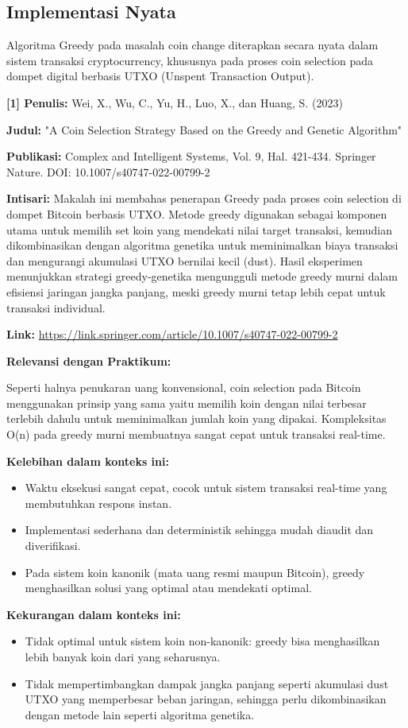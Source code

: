 \subsection{Implementasi Nyata}
Algoritma Greedy pada masalah coin change diterapkan secara nyata dalam sistem transaksi cryptocurrency, khususnya pada proses coin selection pada dompet digital berbasis UTXO (Unspent Transaction Output).

\vspace{1em}
\textbf{[1] Penulis:} Wei, X., Wu, C., Yu, H., Luo, X., dan Huang, S. (2023)

\textbf{Judul:} "A Coin Selection Strategy Based on the Greedy and Genetic Algorithm"

\textbf{Publikasi:} Complex and Intelligent Systems, Vol. 9, Hal. 421-434. Springer Nature. DOI: 10.1007/s40747-022-00799-2

\textbf{Intisari:} Makalah ini membahas penerapan Greedy pada proses coin selection di dompet Bitcoin berbasis UTXO. Metode greedy digunakan sebagai komponen utama untuk memilih set koin yang mendekati nilai target transaksi, kemudian dikombinasikan dengan algoritma genetika untuk meminimalkan biaya transaksi dan mengurangi akumulasi UTXO bernilai kecil (dust). Hasil eksperimen menunjukkan strategi greedy-genetika mengungguli metode greedy murni dalam efisiensi jaringan jangka panjang, meski greedy murni tetap lebih cepat untuk transaksi individual.

\textbf{Link:} \url{https://link.springer.com/article/10.1007/s40747-022-00799-2}

\vspace{1em}
\textbf{Relevansi dengan Praktikum:} 

Seperti halnya penukaran uang konvensional, coin selection pada Bitcoin menggunakan prinsip yang sama yaitu memilih koin dengan nilai terbesar terlebih dahulu untuk meminimalkan jumlah koin yang dipakai. Kompleksitas O(n) pada greedy murni membuatnya sangat cepat untuk transaksi real-time.

\vspace{1em}
\textbf{Kelebihan dalam konteks ini:}
\begin{itemize}
    \item Waktu eksekusi sangat cepat, cocok untuk sistem transaksi real-time yang membutuhkan respons instan.
    \item Implementasi sederhana dan deterministik sehingga mudah diaudit dan diverifikasi.
    \item Pada sistem koin kanonik (mata uang resmi maupun Bitcoin), greedy menghasilkan solusi yang optimal atau mendekati optimal.
\end{itemize}

\textbf{Kekurangan dalam konteks ini:}
\begin{itemize}
    \item Tidak optimal untuk sistem koin non-kanonik: greedy bisa menghasilkan lebih banyak koin dari yang seharusnya.
    \item Tidak mempertimbangkan dampak jangka panjang seperti akumulasi dust UTXO yang memperbesar beban jaringan, sehingga perlu dikombinasikan dengan metode lain seperti algoritma genetika.
\end{itemize}
